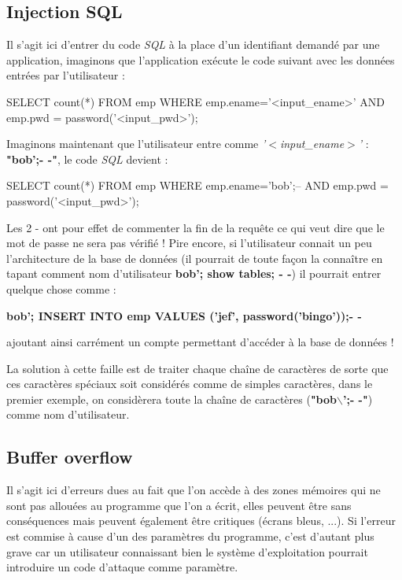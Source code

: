 \documentclass{article}
\newcommand{\titre}[1]{\textcolor{title}{#1}}
\newcommand{\tssect}[1]{\titre{\subsection{#1}}}
\newcommand{\term}[1]{\textit{\textcolor{maintitle}{#1}}}
\begin{document}
\begin{sffamily}
\tssect{Injection SQL}

Il s'agit ici d'entrer du code \term{SQL} à la place d'un identifiant demandé par une application, imaginons que 
l'application exécute le code suivant avec les données entrées par l'utilisateur : 

\begin{center}
	\begin{boxedverbatim}
	SELECT count(*) FROM emp
	WHERE emp.ename=’<input_ename>’ AND emp.pwd = password(’<input_pwd>’);
	\end{boxedverbatim}
\end{center}

Imaginons maintenant que l'utilisateur entre comme \textit{’$<$input\_ename$>$’} : \textbf{"bob’;- -"}, le code 
\term{SQL} devient :

\begin{center}
	\begin{boxedverbatim}
	SELECT count(*) FROM emp
	WHERE emp.ename=’bob’;-- AND emp.pwd = password(’<input_pwd>’);
	\end{boxedverbatim}
\end{center}

\newpage

Les 2 - ont pour effet de commenter la fin de la requête ce qui veut dire que le mot de passe ne sera pas vérifié ! 
Pire encore, si l'utilisateur connait un peu l'architecture de la base de données (il pourrait de toute façon la 
connaître en tapant comment nom d'utilisateur \textbf{bob’; show tables; - -}) il pourrait entrer quelque chose comme :
\begin{center}\textbf{bob’; INSERT INTO emp VALUES (’jef’, password(’bingo’));- -} \end{center}
ajoutant ainsi carrément un compte permettant d'accéder à la base de données !

La solution à cette faille est de traiter chaque chaîne de caractères de sorte que ces caractères spéciaux soit 
considérés comme de simples caractères, dans le premier exemple, on considèrera toute la chaîne de caractères 
(\textbf{"bob$\backslash$’;- -"}) comme nom d'utilisateur.

\tssect{Buffer overflow}

Il s'agit ici d'erreurs dues au fait que l'on accède à des zones mémoires qui ne sont pas allouées au 
programme que l'on a écrit, elles peuvent être sans conséquences mais peuvent également être critiques (écrans bleus, 
...). Si l'erreur est commise à cause d'un des paramètres du programme, c'est d'autant plus grave car
un utilisateur connaissant bien le système d'exploitation pourrait introduire un code d'attaque comme paramètre.


\end{sffamily}
\end{document}
